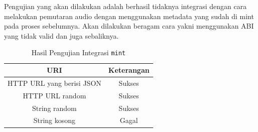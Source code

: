 Pengujian yang akan dilakukan adalah berhasil tidaknya integrasi dengan cara
melakukan pemutaran audio dengan menggunakan metadata yang sudah di mint pada proses sebelumnya.
Akan dilakukan beragam cara yakni menggunakan ABI yang tidak valid dan juga sebaliknya.

\begin{longtable}{|c|c|}
  \caption{Hasil Pengujian Integrasi \texttt{mint}}
  \label{tb:UjiIntegrasiUE5}                              \\
  \hline
  \rowcolor[HTML]{C0C0C0}
  \textbf{URI}              & \textbf{Keterangan} \\
  \hline
  HTTP URL yang berisi JSON & Sukses              \\
  HTTP URL random           & Sukses              \\
  String random             & Sukses              \\
  String kosong             & Gagal               \\
  \hline
\end{longtable}
